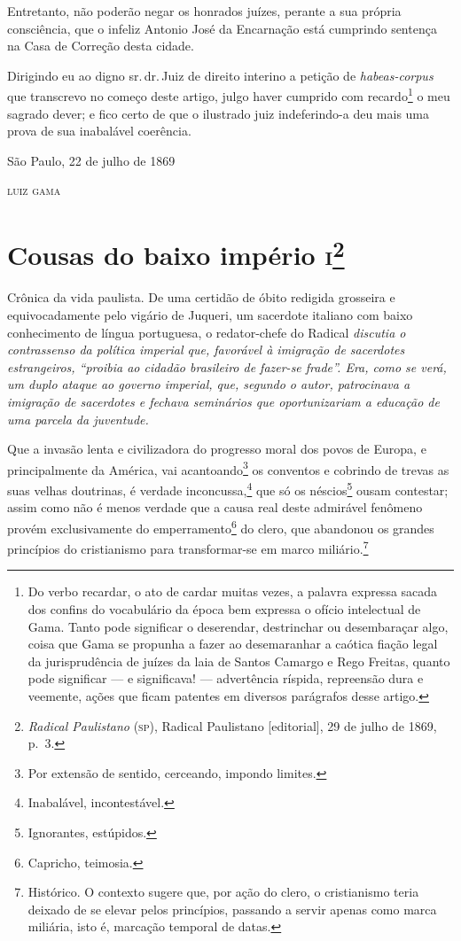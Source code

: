 Entretanto, não poderão negar os honrados juízes, perante a sua própria
consciência, que o infeliz Antonio José da Encarnação está cumprindo
sentença na Casa de Correção desta cidade.

Dirigindo eu ao digno sr.\,dr.\,Juiz de direito interino a petição de
\emph{habeas-corpus} que transcrevo no começo deste artigo, julgo haver
cumprido com recardo\footnote{Do verbo recardar, o ato de cardar
  muitas vezes, a palavra expressa sacada dos confins do vocabulário da
  época bem expressa o ofício intelectual de Gama. Tanto pode significar
  o deserendar, destrinchar ou desembaraçar algo, coisa que Gama se
  propunha a fazer ao desemaranhar a caótica fiação legal da
  jurisprudência de juízes da laia de Santos Camargo e Rego Freitas,
  quanto pode significar --- e significava! --- advertência ríspida,
  repreensão dura e veemente, ações que ficam patentes em diversos
  parágrafos desse artigo.} o meu sagrado dever; e fico certo de que o
ilustrado juiz indeferindo-a deu mais uma prova de sua inabalável
coerência.

\begin{flushright}
São Paulo, 22 de julho de 1869

\textsc{luiz gama}
\end{flushright}

\chapter{Cousas do baixo império \textsc{i}\footnote{\emph{Radical
  Paulistano} (\textsc{sp}), Radical Paulistano {[}editorial{]}, 29 de julho de 1869,
  p.~3.}}

\begin{didascalia}
Crônica da vida paulista. De uma certidão de óbito redigida grosseira e
equivocadamente pelo vigário de Juqueri, um sacerdote italiano com baixo
conhecimento de língua portuguesa, o redator-chefe do Radical
\emph{discutia o contrassenso da política imperial que, favorável à
imigração de sacerdotes estrangeiros, ``proibia ao cidadão
brasileiro de fazer-se frade''. Era, como se verá, um duplo ataque ao
governo imperial, que, segundo o autor, patrocinava a imigração de
sacerdotes e fechava seminários que oportunizariam a educação de uma
parcela da juventude.}
\end{didascalia}



Que a invasão lenta e civilizadora do progresso moral dos povos de
Europa, e principalmente da América, vai acantoando\footnote{Por
  extensão de sentido, cerceando, impondo limites.} os conventos e
cobrindo de trevas as suas velhas doutrinas, é verdade
inconcussa,\footnote{Inabalável, incontestável.} que só os
néscios\footnote{Ignorantes, estúpidos.} ousam contestar; assim como
não é menos verdade que a causa real deste admirável fenômeno provém
exclusivamente do emperramento\footnote{Capricho, teimosia.} do clero,
que abandonou os grandes princípios do cristianismo para transformar-se
em marco miliário.\footnote{Histórico. O contexto sugere que, por ação
  do clero, o cristianismo teria deixado de se elevar pelos princípios,
  passando a servir apenas como marca miliária, isto é, marcação
  temporal de datas.}

